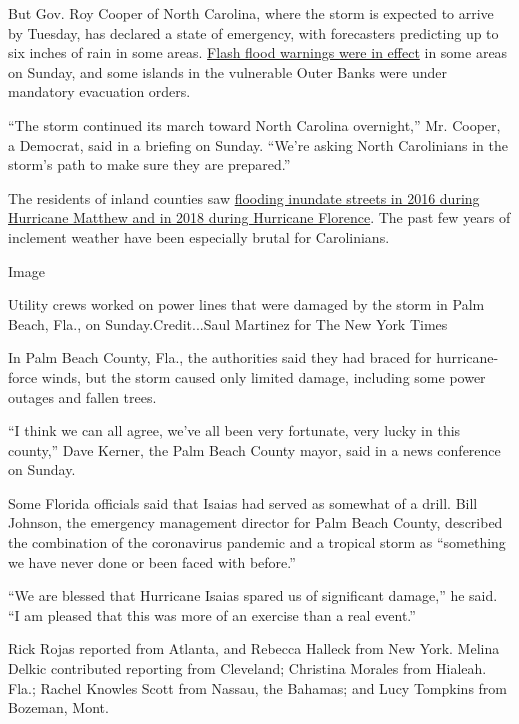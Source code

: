 But Gov. Roy Cooper of North Carolina, where the storm is expected to
arrive by Tuesday, has declared a state of emergency, with forecasters
predicting up to six inches of rain in some areas.
\href{https://alerts.weather.gov/cap/wwacapget.php?x=NC125F5DA2F1C4.HurricaneLocalStatement.125F5DA42AA8NC.ILMHLSILM.3d2f501b896f05f00166a758bf00288a}{Flash
flood warnings were in effect} in some areas on Sunday, and some islands
in the vulnerable Outer Banks were under mandatory evacuation orders.

``The storm continued its march toward North Carolina overnight,'' Mr.
Cooper, a Democrat, said in a briefing on Sunday. ``We're asking North
Carolinians in the storm's path to make sure they are prepared.''

The residents of inland counties saw
\href{https://www.nytimes3xbfgragh.onion/2018/09/18/us/north-carolina-hurricanes-storms-history.html}{flooding
inundate streets in 2016 during Hurricane Matthew and in 2018 during
Hurricane Florence}. The past few years of inclement weather have been
especially brutal for Carolinians.

Image

Utility crews worked on power lines that were damaged by the storm in
Palm Beach, Fla., on Sunday.Credit...Saul Martinez for The New York
Times

In Palm Beach County, Fla., the authorities said they had braced for
hurricane-force winds, but the storm caused only limited damage,
including some power outages and fallen trees.

``I think we can all agree, we've all been very fortunate, very lucky in
this county,'' Dave Kerner, the Palm Beach County mayor, said in a news
conference on Sunday.

Some Florida officials said that Isaias had served as somewhat of a
drill. Bill Johnson, the emergency management director for Palm Beach
County, described the combination of the coronavirus pandemic and a
tropical storm as ``something we have never done or been faced with
before.''

``We are blessed that Hurricane Isaias spared us of significant
damage,'' he said. ``I am pleased that this was more of an exercise than
a real event.''

Rick Rojas reported from Atlanta, and Rebecca Halleck from New York.
Melina Delkic contributed reporting from Cleveland; Christina Morales
from Hialeah. Fla.; Rachel Knowles Scott from Nassau, the Bahamas; and
Lucy Tompkins from Bozeman, Mont.


